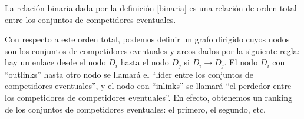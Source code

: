 \begin{cor}
La relación binaria dada por la definición \ref{binaria} es una relación de orden total entre los conjuntos de competidores eventuales.
\end{cor}

\begin{nota}
Con respecto a este orden total, podemos definir un grafo dirigido cuyos nodos son los conjuntos de competidores eventuales y arcos dados por la siguiente regla: hay un enlace desde el nodo $D_i$ hasta el nodo $D_j$ si $D_i \to D_j$. El nodo $D_i$ con ``outlinks'' hasta otro nodo se llamará el ``líder entre los conjuntos de competidores eventuales'', y el nodo con ``inlinks'' se llamará ``el perdedor entre los competidores de competidores eventuales''. En efecto, obtenemos un ranking de los conjuntos de competidores eventuales: el primero, el segundo, etc.  
\end{nota}

